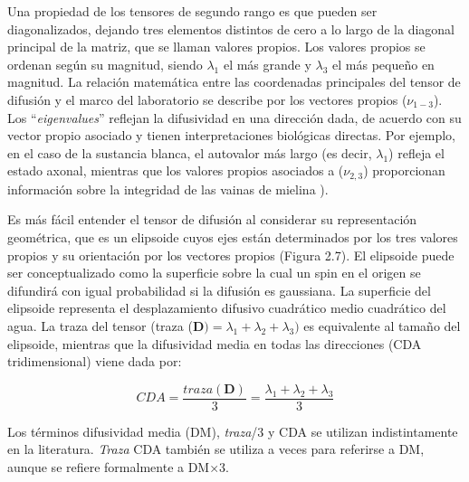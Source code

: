 \documentclass[12pt,a5,twoside]{book}
\begin{document}
Una propiedad de los tensores de segundo rango es que pueden ser diagonalizados, dejando tres elementos distintos de cero a lo largo de la diagonal principal de la matriz, que se llaman valores propios. Los valores propios se ordenan según su magnitud, siendo $\lambda_{1}$ el más grande y $\lambda_{3}$ el más pequeño en magnitud. La relación matemática entre las coordenadas principales del tensor de difusión y el marco del laboratorio se describe por los vectores propios ($\nu_{1-3}$). Los ``{\it eigenvalues}'' reflejan la difusividad en una dirección dada, de acuerdo con su vector propio asociado y tienen interpretaciones biológicas directas. Por ejemplo, en el caso de la sustancia blanca, el autovalor más largo (es decir, $\lambda_{1}$) refleja el estado axonal, mientras que los valores propios asociados a ($\nu_{2,3}$) proporcionan información sobre la integridad de las vainas de mielina \citep{Song_2003,Concha_2006}).

Es más fácil entender el tensor de difusión al considerar su representación geométrica, que es un elipsoide cuyos ejes están determinados por los tres valores propios y su orientación por los vectores propios (Figura 2.7). El elipsoide puede ser conceptualizado como la superficie sobre la cual un spin en el origen se difundirá con igual probabilidad si la difusión es gaussiana. La superficie del elipsoide representa el desplazamiento difusivo cuadrático medio cuadrático del agua. La traza del tensor (traza ($\textbf {D}) = \lambda_1 + \lambda_2 + \lambda_3)$ es equivalente al tamaño del elipsoide, mientras que la difusividad media en todas las direcciones (CDA tridimensional) viene dada por:

\begin{equation}
CDA = \frac{traza (\textbf{D})}{3} = \frac{\lambda_{1} + \lambda_{2} + \lambda_{3}}{3}
\end{equation}

Los términos difusividad media (DM), {\it traza}/3 y CDA se utilizan indistintamente en la literatura. {\it Traza} CDA también se utiliza a veces para referirse a DM, aunque se refiere formalmente a DM×3.
\end{document}
